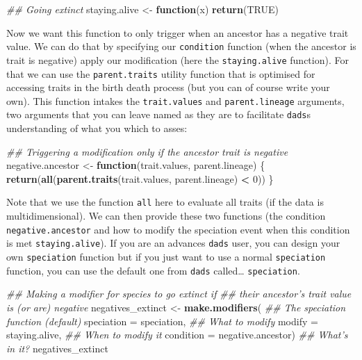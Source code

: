 \documentclass[]{book}
\newenvironment{Shaded}{\begin{snugshade}}{\end{snugshade}}
\newcommand{\CommentTok}[1]{\textcolor[rgb]{0.56,0.35,0.01}{\textit{#1}}}
\newcommand{\ControlFlowTok}[1]{\textcolor[rgb]{0.13,0.29,0.53}{\textbf{#1}}}
\newcommand{\DataTypeTok}[1]{\textcolor[rgb]{0.13,0.29,0.53}{#1}}
\newcommand{\DecValTok}[1]{\textcolor[rgb]{0.00,0.00,0.81}{#1}}
\newcommand{\KeywordTok}[1]{\textcolor[rgb]{0.13,0.29,0.53}{\textbf{#1}}}
\newcommand{\NormalTok}[1]{#1}
\newcommand{\OperatorTok}[1]{\textcolor[rgb]{0.81,0.36,0.00}{\textbf{#1}}}
\newcommand{\OtherTok}[1]{\textcolor[rgb]{0.56,0.35,0.01}{#1}}
\newcommand{\StringTok}[1]{\textcolor[rgb]{0.31,0.60,0.02}{#1}}
\begin{document}
\begin{Shaded}
\begin{Highlighting}[]
\CommentTok{## Going extinct}
\NormalTok{staying.alive <-}\StringTok{ }\ControlFlowTok{function}\NormalTok{(x) }\KeywordTok{return}\NormalTok{(}\OtherTok{TRUE}\NormalTok{)}
\end{Highlighting}
\end{Shaded}

Now we want this function to only trigger when an ancestor has a negative trait value.
We can do that by specifying our \texttt{condition} function (when the ancestor is trait is negative) apply our modification (here the \texttt{staying.alive} function).
For that we can use the \texttt{parent.traits} utility function that is optimised for accessing traits in the birth death process (but you can of course write your own).
This function intakes the \texttt{trait.values} and \texttt{parent.lineage} arguments, two arguments that you can leave named as they are to facilitate \texttt{dads}s understanding of what you which to asses:

\begin{Shaded}
\begin{Highlighting}[]
\CommentTok{## Triggering a modification only if the ancestor trait is negative}
\NormalTok{negative.ancestor <-}\StringTok{ }\ControlFlowTok{function}\NormalTok{(trait.values, parent.lineage) \{}
    \KeywordTok{return}\NormalTok{(}\KeywordTok{all}\NormalTok{(}\KeywordTok{parent.traits}\NormalTok{(trait.values, parent.lineage) }\OperatorTok{<}\StringTok{ }\DecValTok{0}\NormalTok{))}
\NormalTok{\}}
\end{Highlighting}
\end{Shaded}

Note that we use the function \texttt{all} here to evaluate all traits (if the data is multidimensional).
We can then provide these two functions (the condition \texttt{negative.ancestor} and how to modify the speciation event when this condition is met \texttt{staying.alive}).
If you are an advances \texttt{dads} user, you can design your own \texttt{speciation} function but if you just want to use a normal \texttt{speciation} function, you can use the default one from \texttt{dads} called\ldots{} \texttt{speciation}.

\begin{Shaded}
\begin{Highlighting}[]
\CommentTok{## Making a modifier for species to go extinct if}
\CommentTok{## their ancestor's trait value is (or are) negative}
\NormalTok{negatives_extinct <-}\StringTok{ }\KeywordTok{make.modifiers}\NormalTok{(}
                        \CommentTok{## The speciation function (default)}
                        \DataTypeTok{speciation =}\NormalTok{ speciation,}
                        \CommentTok{## What to modify}
                        \DataTypeTok{modify     =}\NormalTok{ staying.alive,}
                        \CommentTok{## When to modify it}
                        \DataTypeTok{condition  =}\NormalTok{ negative.ancestor)}
\CommentTok{## What's in it?}
\NormalTok{negatives_extinct}
\end{Highlighting}
\end{Shaded}
\end{document}
